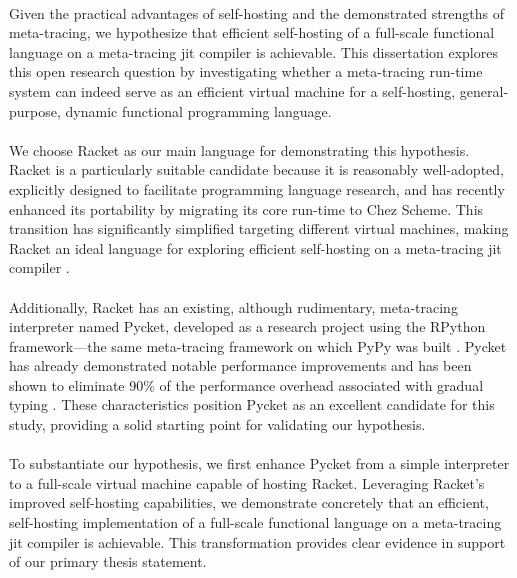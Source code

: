         \paragraph{}%
            Given the practical advantages of self-hosting and the demonstrated strengths of meta-tracing, we hypothesize that efficient self-hosting of a full-scale functional language on a meta-tracing \gls{jit} compiler is achievable. This dissertation explores this open research question by investigating whether a meta-tracing run-time system can indeed serve as an efficient virtual machine for a self-hosting, general-purpose, dynamic functional programming language.

        \paragraph{}%
            We choose Racket as our main language for demonstrating this hypothesis. Racket is a particularly suitable candidate because it is reasonably well-adopted, explicitly designed to facilitate programming language research, and has recently enhanced its portability by migrating its core run-time to Chez Scheme. This transition has significantly simplified targeting different virtual machines, making Racket an ideal language for exploring efficient self-hosting on a meta-tracing \gls{jit} compiler \cite{icfp2019}.

        \paragraph{}%
            Additionally, Racket has an existing, although rudimentary, meta-tracing interpreter named Pycket, developed as a research project using the RPython framework—the same meta-tracing framework on which PyPy was built \cite{bolzPhDThesis,bolzMetatracingMakesFast2014}. Pycket has already demonstrated notable performance improvements and has been shown to eliminate 90\% of the performance overhead associated with gradual typing \cite{pycketmain,pycketmain2}. These characteristics position Pycket as an excellent candidate for this study, providing a solid starting point for validating our hypothesis.

        \paragraph{}%
            To substantiate our hypothesis, we first enhance Pycket from a simple interpreter to a full-scale virtual machine capable of hosting Racket. Leveraging Racket's improved self-hosting capabilities, we demonstrate concretely that an efficient, self-hosting implementation of a full-scale functional language on a meta-tracing \gls{jit} compiler is achievable. This transformation provides clear evidence in support of our primary thesis statement.

